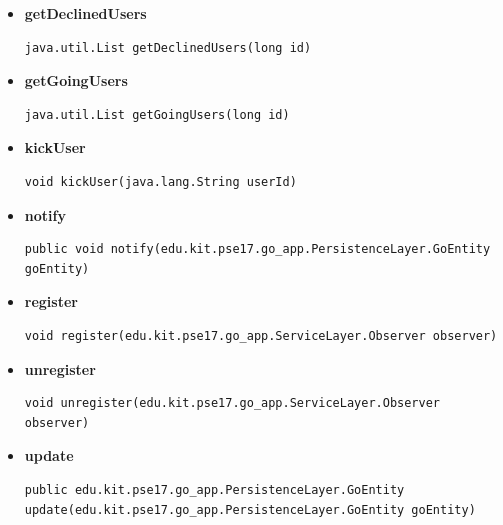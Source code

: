 \documentclass[11pt,a4paper]{report}
\begin{document}
{{{{{{{{{{{{\begin{itemize}
{}%
\item{ 
\hypertarget{edu.kit.pse17.go_app.PersistenceLayer.daos.GoDaoImp.getDeclinedUsers(long)}{{\bf  getDeclinedUsers}\\}
\begin{lstlisting}[frame=none]
java.util.List getDeclinedUsers(long id)\end{lstlisting} %
}%
\item{ 
\hypertarget{edu.kit.pse17.go_app.PersistenceLayer.daos.GoDaoImp.getGoingUsers(long)}{{\bf  getGoingUsers}\\}
\begin{lstlisting}[frame=none]
java.util.List getGoingUsers(long id)\end{lstlisting} %
}%
\item{ 
\hypertarget{edu.kit.pse17.go_app.PersistenceLayer.daos.GoDaoImp.kickUser(java.lang.String)}{{\bf  kickUser}\\}
\begin{lstlisting}[frame=none]
void kickUser(java.lang.String userId)\end{lstlisting} %
}%
\item{ 
\hypertarget{edu.kit.pse17.go_app.PersistenceLayer.daos.GoDaoImp.notify(edu.kit.pse17.go_app.PersistenceLayer.GoEntity)}{{\bf  notify}\\}
\begin{lstlisting}[frame=none]
public void notify(edu.kit.pse17.go_app.PersistenceLayer.GoEntity goEntity)\end{lstlisting} %
}%
\item{ 
\hypertarget{edu.kit.pse17.go_app.PersistenceLayer.daos.GoDaoImp.register(edu.kit.pse17.go_app.ServiceLayer.Observer)}{{\bf  register}\\}
\begin{lstlisting}[frame=none]
void register(edu.kit.pse17.go_app.ServiceLayer.Observer observer)\end{lstlisting} %
}%
\item{ 
\hypertarget{edu.kit.pse17.go_app.PersistenceLayer.daos.GoDaoImp.unregister(edu.kit.pse17.go_app.ServiceLayer.Observer)}{{\bf  unregister}\\}
\begin{lstlisting}[frame=none]
void unregister(edu.kit.pse17.go_app.ServiceLayer.Observer observer)\end{lstlisting} %
}%
\item{ 
\hypertarget{edu.kit.pse17.go_app.PersistenceLayer.daos.GoDaoImp.update(edu.kit.pse17.go_app.PersistenceLayer.GoEntity)}{{\bf  update}\\}
\begin{lstlisting}[frame=none]
public edu.kit.pse17.go_app.PersistenceLayer.GoEntity update(edu.kit.pse17.go_app.PersistenceLayer.GoEntity goEntity)\end{lstlisting} %
}%
\end{itemize}
}
}}}}}}}}}}}
\end{document}
